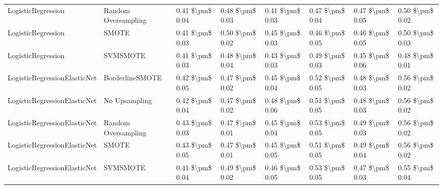 \begin{tabular}{llllllll}
             LogisticRegression &           Random Oversampling & 0.41 \$\textbackslash pm\$ 0.04 &           0.48 \$\textbackslash pm\$ 0.03 &       0.41 \$\textbackslash pm\$ 0.03 &        0.47 \$\textbackslash pm\$ 0.04 &                         0.47 \$\textbackslash pm\$ 0.05 &     0.50 \$\textbackslash pm\$ 0.02 \\
             LogisticRegression &                         SMOTE & 0.41 \$\textbackslash pm\$ 0.03 &           0.50 \$\textbackslash pm\$ 0.02 &       0.45 \$\textbackslash pm\$ 0.03 &        0.46 \$\textbackslash pm\$ 0.05 &                         0.46 \$\textbackslash pm\$ 0.05 &     0.50 \$\textbackslash pm\$ 0.03 \\
             LogisticRegression &                      SVMSMOTE & 0.41 \$\textbackslash pm\$ 0.03 &           0.48 \$\textbackslash pm\$ 0.04 &       0.43 \$\textbackslash pm\$ 0.03 &        0.49 \$\textbackslash pm\$ 0.03 &                         0.45 \$\textbackslash pm\$ 0.06 &     0.48 \$\textbackslash pm\$ 0.01 \\
   LogisticRegressionElasticNet &               BorderlineSMOTE & 0.42 \$\textbackslash pm\$ 0.05 &           0.47 \$\textbackslash pm\$ 0.02 &       0.45 \$\textbackslash pm\$ 0.04 &        0.52 \$\textbackslash pm\$ 0.05 &                         0.48 \$\textbackslash pm\$ 0.03 &     0.56 \$\textbackslash pm\$ 0.02 \\
   LogisticRegressionElasticNet &                 No Upsampling & 0.42 \$\textbackslash pm\$ 0.04 &           0.47 \$\textbackslash pm\$ 0.02 &       0.48 \$\textbackslash pm\$ 0.06 &        0.51 \$\textbackslash pm\$ 0.05 &                         0.48 \$\textbackslash pm\$ 0.03 &     0.56 \$\textbackslash pm\$ 0.02 \\
   LogisticRegressionElasticNet &           Random Oversampling & 0.43 \$\textbackslash pm\$ 0.03 &           0.47 \$\textbackslash pm\$ 0.01 &       0.45 \$\textbackslash pm\$ 0.04 &        0.53 \$\textbackslash pm\$ 0.05 &                         0.49 \$\textbackslash pm\$ 0.03 &     0.56 \$\textbackslash pm\$ 0.02 \\
   LogisticRegressionElasticNet &                         SMOTE & 0.43 \$\textbackslash pm\$ 0.05 &           0.47 \$\textbackslash pm\$ 0.01 &       0.45 \$\textbackslash pm\$ 0.05 &        0.51 \$\textbackslash pm\$ 0.05 &                         0.49 \$\textbackslash pm\$ 0.04 &     0.56 \$\textbackslash pm\$ 0.02 \\
   LogisticRegressionElasticNet &                      SVMSMOTE & 0.41 \$\textbackslash pm\$ 0.04 &           0.49 \$\textbackslash pm\$ 0.02 &       0.46 \$\textbackslash pm\$ 0.05 &        0.53 \$\textbackslash pm\$ 0.05 &                         0.47 \$\textbackslash pm\$ 0.03 &     0.55 \$\textbackslash pm\$ 0.04 \\

\end{tabular}

